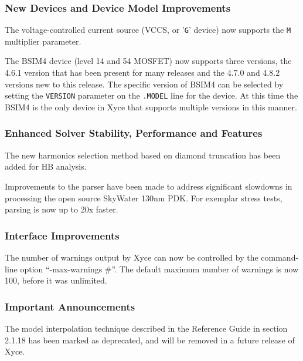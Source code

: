 \documentclass[letterpaper]{scrartcl}
\begin{document}
\subsubsection*{New Devices and Device Model Improvements}
\begin{XyceItemize}
\item The voltage-controlled current source (VCCS, or '\texttt{G}'
    device) now supports the \texttt{M} multiplier parameter.
\item The BSIM4 device (level 14 and 54 MOSFET) now supports three
  versions, the 4.6.1 version that has been present for many releases
  and the 4.7.0 and 4.8.2 versions new to this release.  The specific
  version of BSIM4 can be selected by setting the \texttt{VERSION}
  parameter on the \texttt{.MODEL} line for the device.  At this time
  the BSIM4 is the only device in Xyce that supports multiple versions
  in this manner.
\end{XyceItemize}

\subsubsection*{Enhanced Solver Stability, Performance and Features}
\begin{XyceItemize}
\item The new harmonics selection method based on diamond truncation has
  been added for HB analysis.
\item Improvements to the parser have been made to address significant
  slowdowns in processing the open source SkyWater 130nm PDK.  For
  exemplar stress tests, parsing is now up to 20x faster.
\end{XyceItemize}

\subsubsection*{Interface Improvements}
\begin{XyceItemize}
\item The number of warnings output by Xyce can now be controlled by
  the command-line option ``-max-warnings \#''.  The default maximum
  number of warnings is now 100, before it was unlimited.
\end{XyceItemize}

\subsubsection*{Important Announcements}
\begin{XyceItemize}
\item The model interpolation technique described in the \Xyce{}
  Reference Guide in section 2.1.18 has been marked as deprecated, and
  will be removed in a future release of Xyce.
\end{XyceItemize}
\end{document}
